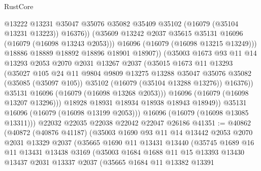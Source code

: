 \begin{lexlean}{RustCore}
\begin{coremodule}
                        @13222
                        @13231
                        @35047
                        @35076
                        @35082
                        @35409
                        @35102
                        (@16079 (@35104 @13231 @13223))
                        @16376))
                    (@35609 @13242 @2037 @35615 @35131 @16096 (@16079 (@16098 @13243 @2053)))
                    @16096
                    (@16079 (@16098 @13215 @13249)))
                  @18886
                  @18889
                  @18892
                  @18896
                  @18901
                  @18907))
              (@35003
                @1673
                @93
                @11
                @14
                @13293
                @2053
                @2070
                @2031
                @13267
                @2037
                (@35015
                  @1673
                  @11
                  @13293
                  (@35027
                    @105
                    @24
                    @11
                    @9804
                    @9809
                    @13275
                    @13288
                    @35047
                    @35076
                    @35082
                    (@35085 (@35097 @105))
                    @35102
                    (@16079 (@35104 @13288 @13276))
                    @16376))
                @35131
                @16096
                (@16079 (@16098 @13268 @2053)))
              @16096
              (@16079 (@16098 @13207 @13296)))
            @18928
            @18931
            @18934
            @18938
            @18943
            @18949))
        @35131
        @16096
        (@16079 (@16098 @13199 @2053)))
      @16096
      (@16079 (@16098 @13085 @13311)))
    @22032
    @22035
    @22038
    @22042
    @22047
    @26186
@41351 := @40862
    (@40872
      (@40876 @41187)
      (@35003
        @1690
        @93
        @11
        @14
        @13442
        @2053
        @2070
        @2031
        @13329
        @2037
        (@35665
          @1690
          @11
          @13431
          @13440
          (@35745
            @1689
            @16
            @11
            @13431
            @13438
            @3169
            (@35003
              @1684
              @1688
              @11
              @15
              @13393
              @13430
              @13437
              @2031
              @13337
              @2037
              (@35665
                @1684
                @11
                @13382
                @13391

\end{coremodule}
\end{lexlean}
